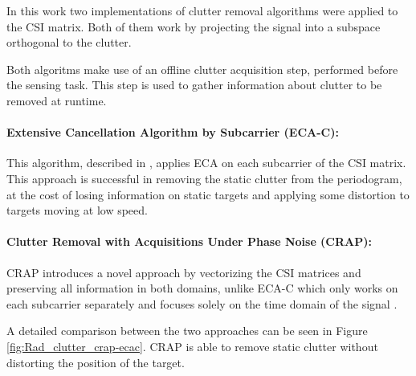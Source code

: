	In this work two implementations of clutter removal algorithms were applied to the CSI matrix.
	Both of them work by projecting the signal into a subspace orthogonal to the clutter.
	
	Both algoritms make use of an offline clutter acquisition step, performed before the sensing task. This step is used to gather information about clutter to be removed at runtime.
	
	\paragraph{Extensive Cancellation Algorithm by Subcarrier (ECA-C):}
	This algorithm, described in \cite{Wan_Cheng_Gong_Zhao_Shao_2012}, applies ECA \cite{Colone_ECA_2009} on each subcarrier of the CSI matrix.
	This approach is successful in removing the static clutter from the periodogram, at the cost of losing information on static targets and applying some distortion to targets moving at low speed.
	
	
	\paragraph{Clutter Removal with Acquisitions Under Phase Noise (CRAP):}
	CRAP introduces a novel approach by vectorizing the CSI matrices and preserving all information in both domains, unlike ECA-C which only works on each subcarrier separately and focuses solely on the time domain of the signal \cite{Henninger_CRAP_2023}.
	
	A detailed comparison between the two approaches can be seen in Figure \ref{fig:Rad_clutter_crap-ecac}. CRAP is able to remove static clutter without distorting the position of the target.

